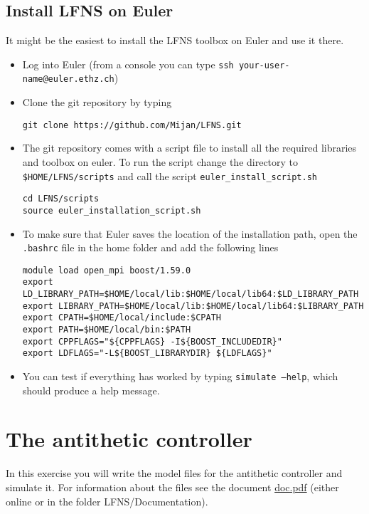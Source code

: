 \documentclass[11pt]{article} %
\begin{document}
\subsection{Install LFNS on Euler}
It might be the easiest to install the LFNS toolbox on Euler and use it there. 
\begin{itemize}
	\item Log into Euler (from a console you can type \texttt{ssh your-user-name@euler.ethz.ch})
	\item Clone the git repository by typing
	\begin{tcolorbox}
\begin{verbatim}
git clone https://github.com/Mijan/LFNS.git
\end{verbatim}
\end{tcolorbox}
	\item The git repository comes with a script file to install all the required libraries and toolbox on euler. To run the script change the directory to \texttt{\$HOME/LFNS/scripts} and call the script \texttt{euler\_install\_script.sh}
	\begin{tcolorbox}
\begin{verbatim}
cd LFNS/scripts
source euler_installation_script.sh
\end{verbatim}
\end{tcolorbox}
\item To make sure that Euler saves the location of the installation path, open the \texttt{.bashrc} file in the home folder and add the following lines
	\begin{tcolorbox}
\begin{verbatim}
module load open_mpi boost/1.59.0
export LD_LIBRARY_PATH=$HOME/local/lib:$HOME/local/lib64:$LD_LIBRARY_PATH
export LIBRARY_PATH=$HOME/local/lib:$HOME/local/lib64:$LIBRARY_PATH
export CPATH=$HOME/local/include:$CPATH
export PATH=$HOME/local/bin:$PATH
export CPPFLAGS="${CPPFLAGS} -I${BOOST_INCLUDEDIR}"
export LDFLAGS="-L${BOOST_LIBRARYDIR} ${LDFLAGS}"
\end{verbatim}
\end{tcolorbox}
\item You can test if everything has worked by typing \texttt{simulate --help}, which should produce a help message. 
\end{itemize}

\section{The antithetic controller}
In this exercise you will write the model files for the antithetic controller and simulate it. For information about the files see the document \href{https://github.com/Mijan/LFNS/blob/publishable/Documentation/doc.pdf}{doc.pdf} (either online or in the folder LFNS/Documentation). 
\end{document}
